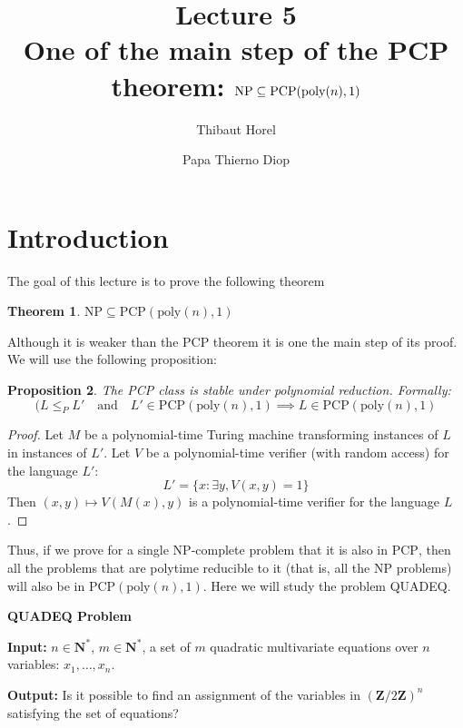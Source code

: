 \documentclass[a4paper,10pt]{article}
\author{Thibaut Horel\and Papa Thierno Diop}
\title{Lecture 5\\ One of the main step of the PCP theorem: $\NP \subseteq
\PCP(\mathrm{poly}(n),1)$}
\newcommand{\NP}{\mathrm{NP}}
\newcommand{\PCP}{\mathrm{PCP}}
\newtheorem{thm}{Theorem}[section]
\newtheorem{prop}[thm]{Proposition}
\theoremstyle{remark}
\newenvironment{encadre}[1]
{
\begin{lrbox}{\fmbox}
\begin{minipage}{\textwidth-3em}
\vspace{0.3\baselineskip}\setlength{\parskip}{0.5em}
}
{
\vspace{\baselineskip}
\end{minipage}\end{lrbox}
\begin{center}
\fbox{\hspace{1em}\usebox{\fmbox}\hspace{1em}}
\end{center}
\vspace{0.5\baselineskip}
}
\begin{document}
\maketitle
\section{Introduction}
The goal of this lecture is to prove the following theorem
\begin{thm}\label{thm1}
$\NP \subseteq
\PCP(\mathrm{poly}(n),1)$
\end{thm}

Although it is weaker than the PCP theorem it is one the main step of its proof.
We will use the following proposition:
\begin{prop}
The PCP class is stable under polynomial reduction. Formally:
\begin{displaymath}
(L\leq_P L' \quad\mathrm{and}\quad L'\in \PCP(\mathrm{poly}(n),1) \implies L\in
\PCP(\mathrm{poly}(n),1)
\end{displaymath}
\end{prop}

\begin{proof}
Let $M$ be a polynomial-time Turing machine transforming instances of $L$ in
instances of $L'$. Let $V$ be a polynomial-time verifier (with random access)
for the language $L'$:
\begin{displaymath}
L' = \{ x: \exists y, V(x,y) = 1 \}
\end{displaymath}
Then $(x,y)\mapsto V(M(x),y)$ is a polynomial-time verifier for the language
$L$. 
\end{proof}

Thus, if we prove for a single NP-complete problem that it is also in
$\PCP$, then all the problems that are polytime reducible to
it (that is, all the NP problems) will also be in $\PCP(\mathrm{poly}(n),1)$.
Here we will study the problem \textsf{QUADEQ}.

\begin{encadre}{\textwidth}
\begin{center}
\textbf{\textsf{QUADEQ} Problem}
\end{center}

\textbf{Input:} $n\in\mathbf{N}^*$, $m\in\mathbf{N}^*$, a set of $m$ quadratic
multivariate equations over $n$ variables: $x_1,\ldots,x_n$.

\textbf{Output:} Is it possible to find an assignment of the variables in
$(\mathbf{Z}/2\mathbf{Z})^n$ satisfying the set of equations?
\end{encadre}
\end{document}
